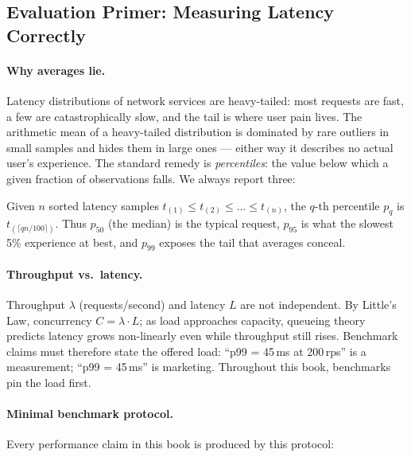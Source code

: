 \label{lst:ch0-sanity}

\subsection{Evaluation Primer: Measuring Latency Correctly}
\label{sec:ch0-eval}

\paragraph{Why averages lie.}
Latency distributions of network services are heavy-tailed: most requests are
fast, a few are catastrophically slow, and the tail is where user pain lives.
The arithmetic mean of a heavy-tailed distribution is dominated by rare
outliers in small samples and hides them in large ones --- either way it
describes no actual user's experience. The standard remedy is
\emph{percentiles}: the value below which a given fraction of observations
falls. We always report three:

\begin{definition}
\label{def:percentile}
Given $n$ sorted latency samples $t_{(1)} \le t_{(2)} \le \dots \le t_{(n)}$,
the $q$-th percentile $p_q$ is $t_{(\lceil q n / 100 \rceil)}$. Thus $p_{50}$
(the median) is the typical request, $p_{95}$ is what the slowest 5\%
experience at best, and $p_{99}$ exposes the tail that averages conceal.
\end{definition}

\paragraph{Throughput vs.\ latency.}
Throughput $\lambda$ (requests/second) and latency $L$ are not independent.
By Little's Law, concurrency $C = \lambda \cdot L$; as load approaches
capacity, queueing theory predicts latency grows non-linearly even while
throughput still rises. Benchmark claims must therefore state the offered
load: ``p99 = 45\,ms at 200\,rps'' is a measurement; ``p99 = 45\,ms'' is
marketing. Throughout this book, benchmarks pin the load first.

\paragraph{Minimal benchmark protocol.}
Every performance claim in this book is produced by this protocol:


